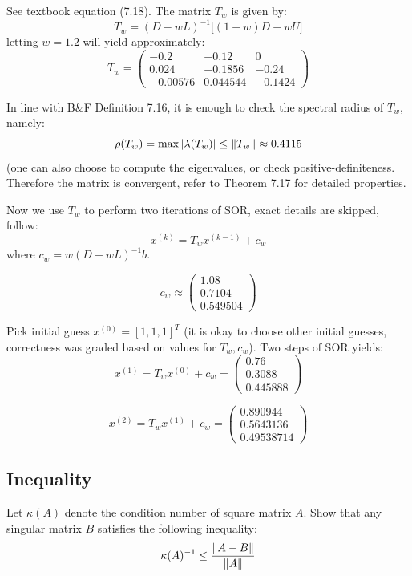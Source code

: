 \documentclass[12pt]{article} %
\newcommand{\ka}{\kappa}
\newcommand{\1}[1]{\mathds{1}\left[#1\right]}
\begin{document}
See textbook equation (7.18). The matrix $T_{w}$ is given by:
$$
	T_{w} = (D - wL)^{-1}\big[
	(1-w)D + wU
	\big]
$$ letting $w=1.2$ will yield approximately:
$$
	T_{w} = 
	\begin{pmatrix}
		-0.2 & -0.12 & 0 \\
		0.024 & -0.1856 & -0.24 \\
		-0.00576 & 0.044544  & -0.1424
	\end{pmatrix}
$$

In line with B\&F Definition 7.16, it is enough to check the spectral radius of $T_w$, namely:
$$
	\rho(T_w) = \max\abs{\lambda(T_w)} \le \norm{T_w} \approx 0.4115
$$ (one can also choose to compute the eigenvalues, or check positive-definiteness. Therefore the matrix is convergent, refer to Theorem 7.17 for detailed properties.

Now we use $T_w$ to perform two iterations of SOR, exact details are skipped, follow:
$$
	x^{(k)} = T_wx^{(k-1)} + c_w
$$ where $c_w = w(D-wL)^{-1}b$. 

$$
	c_w \approx
	\begin{pmatrix}
		1.08 \\
		0.7104\\
		0.549504
	\end{pmatrix}
$$

Pick initial guess $x^{(0)} = [1,1,1]^T$ (it is okay to choose other initial guesses, correctness was graded based on values for $T_w, c_w$). Two steps of SOR yields:
$$
	x^{(1)} = T_wx^{(0)} + c_w = 
	\begin{pmatrix}
		0.76 \\
		0.3088\\
		0.445888
	\end{pmatrix}
$$

$$
	x^{(2)} = T_wx^{(1)} + c_w = 
	\begin{pmatrix}
		0.890944 \\
		0.5643136\\
		0.49538714
	\end{pmatrix}
$$



\newpage
\subsection{Inequality}
Let $\ka(A)$ denote the condition number of square matrix $A$. Show that any singular matrix $B$ satisfies the following inequality:
$$
	\ka(A)^{-1} \le \frac{\norm{A-B}}{\norm{A}}
$$

\subsubsection{}
\end{document}
